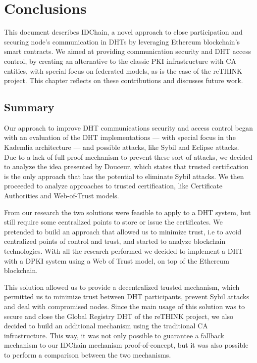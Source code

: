 \chapter{Conclusions}
\label{chapter:conclusion}

This document describes IDChain, a novel approach to close participation and securing node's communication in DHTs by leveraging Ethereum blockchain's smart contracts.
We aimed at providing communication security and DHT access control, by creating an alternative to the classic PKI infrastructure with \acl{CA} entities, with special focus on federated models, as is the case of the reTHINK project.
This chapter reflects on these contributions and discusses future work.

\section{Summary}
\label{section:summary}
Our approach to improve DHT communications security and access control began with an evaluation of the DHT implementations — with special focus in the Kademlia architecture — and possible attacks, like Sybil and Eclipse attacks.
Due to a lack of full proof mechanism to prevent these sort of attacks, we decided to analyze the idea presented by Douceur\cite{Douceur2002}, which states that trusted certification is the only approach that has the potential to eliminate Sybil attacks.
We then proceeded to analyze approaches to trusted certification, like Certificate Authorities and Web-of-Trust models.

From our research the two solutions were feasible to apply to a DHT system, but still require some centralized points to store or issue the certificates.
We pretended to build an approach that allowed us to minimize trust, i.e to avoid centralized points of control and trust, and started to analyze blockchain technologies.
With all the research performed we decided to implement a DHT with a DPKI system using a Web of Trust model, on top of the Ethereum blockchain.

This solution allowed us to provide a decentralized trusted mechanism, which permitted us to minimize trust between DHT participants, prevent Sybil attacks and deal with compromised nodes.
Since the main usage of this solution was to secure and close the Global Registry DHT of the reTHINK project, we also decided to build an additional mechanism using the traditional CA infrastructure.
This way, it was not only possible to guarantee a fallback mechanism to our IDChain mechanism proof-of-concept, but it was also possible to perform a comparison between the two mechanisms.

